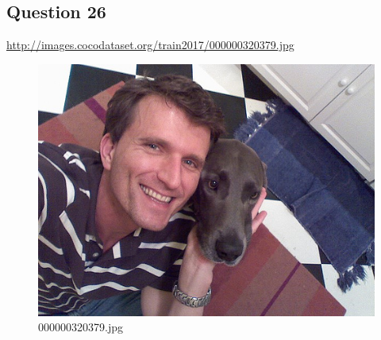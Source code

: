 \subsection*{Question 26}
\url{http://images.cocodataset.org/train2017/000000320379.jpg}
    \begin{figure}[h]
        \centering
        \includegraphics[width=0.8\linewidth]{../image set/easy/000000320379.jpg}
        \caption{000000320379.jpg}
    \end{figure}

